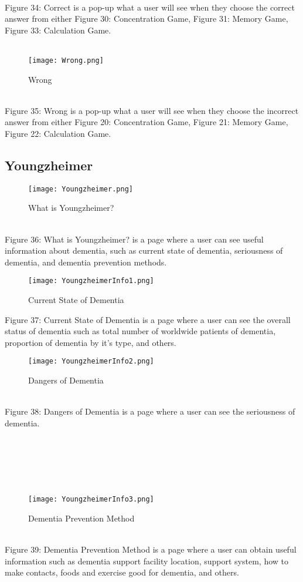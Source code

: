 \documentclass[conference]{IEEEtran}
\begin{document}
\\
Figure 34: Correct is a pop-up what a user will see when they choose the correct answer from either Figure 30: Concentration Game, Figure 31: Memory Game, Figure 33: Calculation Game.
\\\\
\begin{figure}[h]
\centerline{\texttt{[image: Wrong.png]}}
\caption{Wrong}
\label{fig}
\end{figure}
\\
Figure 35: Wrong is a pop-up what a user will see when they choose the incorrect answer from either Figure 20: Concentration Game, Figure 21: Memory Game, Figure 22: Calculation Game.
\subsection{Youngzheimer}
\begin{figure}[h]
\centerline{\texttt{[image: Youngzheimer.png]}}
\caption{What is Youngzheimer?}
\label{fig}
\end{figure}
\\
Figure 36: What is Youngzheimer? is a page where a user can see useful information about dementia, such as current state of dementia, seriousness of dementia, and dementia prevention methods.

\clearpage
\begin{figure}[h]
\centerline{\texttt{[image: YoungzheimerInfo1.png]}}
\caption{Current State of Dementia}
\label{fig}
\end{figure}
Figure 37: Current State of Dementia is a page where a user can see the overall status of dementia such as total number of worldwide patients of dementia, proportion of dementia by it's type, and others.
\\
\begin{figure}[h]
\centerline{\texttt{[image: YoungzheimerInfo2.png]}}
\caption{Dangers of Dementia}
\label{fig}
\end{figure}
\\
Figure 38: Dangers of Dementia is a page where a user can see the seriousness of dementia.
\\\\\\\\\\\\
\begin{figure}[h]
\centerline{\texttt{[image: YoungzheimerInfo3.png]}}
\caption{Dementia Prevention Method}
\label{fig}
\end{figure}
\\
Figure 39: Dementia Prevention Method is a page where a user can obtain useful information such as dementia support facility location, support system, how to make contacts, foods and exercise good for dementia, and others.
\end{document}
